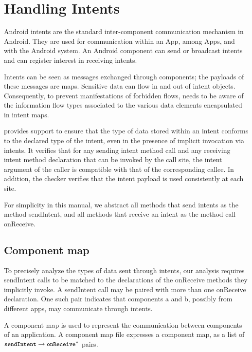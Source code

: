 \htmlhr

\newcommand{\app}{App\xspace}
\newcommand{\apps}{\app{}s\xspace}
\newcommand{\tp}[1]{\mathit{typeof}}
\newcommand{\Fix}[1]{\textbf{[[}{\color{red} #1}\textbf{]]}}


\chapter{Handling Intents\label{flow-checker}}

Android intents are the standard inter-component communication
mechanism in Android.  They are used for communication within an \app,
among \apps, and with the Android system.  An Android component can
send or broadcast intents and can register interest in receiving
intents.

Intents can be seen as messages exchanged through components; the
payloads of these messages are maps.  Sensitive data can flow in and
out of intent objects.  Consequently, to prevent manifestations of
forbidden flows, \theFlowChecker{} needs to be aware of the
information flow types associated to the various data elements
encapsulated in intent maps.

\TheFlowChecker{} provides support to
ensure that the type of data stored within an intent conforms to the
declared type of the intent, even in the presence of implicit
invocation via intents.  It verifies that for any sending intent
method call and any receiving intent method declaration that can be
invoked by the call site, the intent argument of the caller is
compatible with that of the corresponding callee.  In addition, the
checker verifies that the intent payload is used consistently at each
site.

For simplicity in this manual, we abstract all methods that send intents as the
method sendIntent, and all methods that receive an intent as the method call
onReceive.

\section{Component map}
To precisely analyze the types of data sent through intents, our analysis
requires sendIntent calls to be matched to the declarations of the onReceive
methods they implicitly invoke. A sendIntent call may be paired
with more than one onReceive declaration. One such pair indicates that 
components a and b, possibly from different apps, may communicate through 
intents. 

A component map is used to represent the communication between components of an
application. A component map file expresses a 
component map, as a list of $\flow{\|sendIntent|}{\|onReceive|^*}$ pairs.

